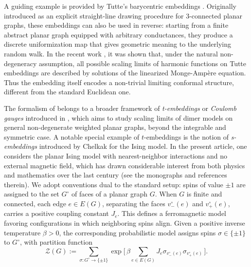 \documentclass[reqno]{amsart}
\numberwithin{equation}{section}
\theoremstyle{definition}
\theoremstyle{remark}
\begin{document}
A guiding example is provided by Tutte's barycentric embeddings \cite{Tutte}. Originally introduced as an explicit straight-line drawing procedure for 3-connected planar graphs, these embeddings can also be used in reverse: starting from a finite abstract planar graph equipped with arbitrary conductances, they produce a discrete uniformization map that gives geometric meaning to the underlying random walk. In the recent work \cite{BCLR}, it was shown that, under the natural non-degeneracy assumption, all possible scaling
limits of harmonic functions on Tutte embeddings are described by solutions of the linearized Monge-Ampère equation. Thus the embedding itself encodes a non-trivial limiting conformal structure, different from the standard Euclidean one.

The formalism of \cite{BCLR} belongs to a broader framework of \emph{t-embeddings} or \emph{Coulomb gauges} introduced in \cite{KLRR,CLR1,CLR2}, which aims to study scaling limits of dimer models on general non-degenerate weighted planar graphs, beyond the integrable and symmetric case. A notable special example of $t$-embeddings is the notion of \emph{s-embeddings} introduced by Chelkak \cite{Ch-ICM18,Che20} for the Ising model. In the present article, one considers the planar Ising model with nearest-neighbor interactions and no external magnetic field, which has drawn considerable interest from both physics and mathematics over the last century (see the monographs \cite{friedli-velenik-book,mccoy-wu-book,palmer2007planar} and references therein). We adopt conventions dual to the standard setup: spins of value $\pm 1$ are assigned to the set $G^\circ$ of faces of a planar graph $G$. When $G$ is finite and connected, each edge $e \in E(G)$, separating the faces $v^\circ_-(e)$ and $v^\circ_+(e)$, carries a positive coupling constant $J_e$. This defines a ferromagnetic model favoring configurations in which neighboring spins align. Given a positive inverse temperature $\beta > 0$, the corresponding probabilistic model assigns spins $\sigma \in \{\pm1\}$ to $G^\circ$, with partition function
\begin{equation}
\label{eq:intro-Zcirc}
\mathcal{Z}(G) := \sum_{\sigma:G^\circ\to\{\pm 1\}} \exp\big[\,\beta \sum_{e\in E(G)} J_e \sigma_{v^\circ_-(e)} \sigma_{v^\circ_+(e)}\,\big].
\end{equation}
\end{document}
